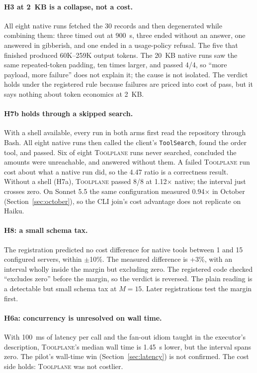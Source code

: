 \documentclass[10pt,twocolumn]{article}
\newcommand{\toolplane}{\textsc{Toolplane}\xspace}
\begin{document}
\paragraph{H3 at 2~KB is a collapse, not a cost.}  All eight native runs
fetched the 30 records and then degenerated while combining them: three timed
out at 900~s, three ended without an answer, one answered in gibberish, and one
ended in a usage-policy refusal.  The five that finished produced 60K--259K
output tokens.  The 20~KB native runs saw the same repeated-token padding,
ten times larger, and passed 4/4, so ``more payload, more failure'' does not
explain it; the cause is not isolated.  The verdict holds under the
registered rule because failures are priced into cost of pass, but it says
nothing about token economics at 2~KB.

\paragraph{H7b holds through a skipped search.}  With a shell available,
every run in both arms first read the repository through Bash.  All eight
native runs then called the client's \texttt{ToolSearch}, found the order
tool, and passed.  Six of eight \toolplane runs never searched, concluded the
amounts were unreachable, and answered without them.  A failed \toolplane run
cost about what a native run did, so the 4.47 ratio is a correctness result.
Without a shell (H7a), \toolplane passed 8/8 at 1.12$\times$ native; the
interval just crosses zero.  On Sonnet 5.5 the same configuration measured
0.94$\times$ in October (Section~\ref{sec:october}), so the CLI join's cost
advantage does not replicate on Haiku.

\paragraph{H8: a small schema tax.}  The registration predicted no cost
difference for native tools between 1 and 15 configured servers, within
$\pm$10\%.  The measured difference is +3\%, with an interval wholly inside
the margin but excluding zero.  The registered code checked ``excludes zero''
before the margin, so the verdict is reversed.  The plain reading is a
detectable but small schema tax at $M=15$.  Later registrations test the
margin first.

\paragraph{H6a: concurrency is unresolved on wall time.}  With 100~ms of
latency per call and the fan-out idiom taught in the executor's description,
\toolplane's median wall time is 1.45~s lower, but the interval spans zero.
The pilot's wall-time win (Section~\ref{sec:latency}) is not confirmed.  The
cost side holds: \toolplane was not costlier.
\end{document}
